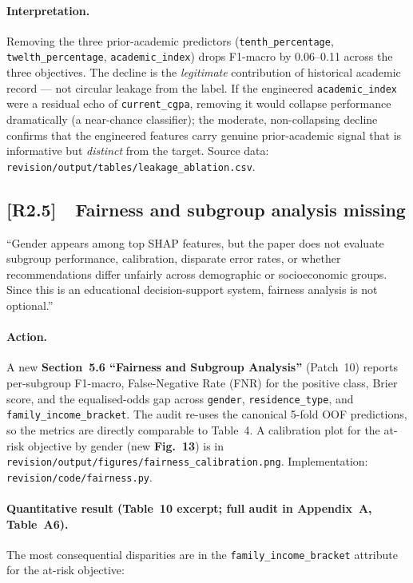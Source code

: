 \documentclass[11pt,a4paper]{article}
\newcommand{\cid}[1]{\textcolor{revred}{\textbf{[#1]}}}
\newcommand{\filebox}[1]{\texttt{\small #1}}
\newcommand{\sectref}[1]{Section~#1}
\newcommand{\stress}[1]{\textbf{#1}}
\begin{document}
\begin{itemize}
\paragraph{Interpretation.} Removing the three prior-academic predictors (\texttt{tenth\_percentage}, \texttt{twelth\_percentage}, \texttt{academic\_index}) drops F1-macro by 0.06--0.11 across the three objectives. The decline is the \emph{legitimate} contribution of historical academic record --- not circular leakage from the label. If the engineered \texttt{academic\_index} were a residual echo of \texttt{current\_cgpa}, removing it would collapse performance dramatically (a near-chance classifier); the moderate, non-collapsing decline confirms that the engineered features carry genuine prior-academic signal that is informative but \emph{distinct} from the target. Source data: \filebox{revision/output/tables/leakage\_ablation.csv}.

\subsection*{\cid{R2.5}~~Fairness and subgroup analysis missing}

\begin{reviewerquote}
``Gender appears among top SHAP features, but the paper does not evaluate subgroup performance, calibration, disparate error rates, or whether recommendations differ unfairly across demographic or socioeconomic groups. Since this is an educational decision-support system, fairness analysis is not optional.''
\end{reviewerquote}

\paragraph{Action.} A new \stress{\sectref{5.6} ``Fairness and Subgroup Analysis''} (Patch~10) reports per-subgroup F1-macro, False-Negative Rate (FNR) for the positive class, Brier score, and the equalised-odds gap across \texttt{gender}, \texttt{residence\_type}, and \texttt{family\_income\_bracket}. The audit re-uses the canonical 5-fold OOF predictions, so the metrics are directly comparable to Table~4. A calibration plot for the at-risk objective by gender (new \stress{Fig.~13}) is in \filebox{revision/output/figures/fairness\_calibration.png}. Implementation: \filebox{revision/code/fairness.py}.

\paragraph{Quantitative result (Table~10 excerpt; full audit in Appendix~A, Table~A6).} The most consequential disparities are in the \texttt{family\_income\_bracket} attribute for the at-risk objective:


\end{itemize}
\end{document}
